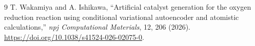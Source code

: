 \documentclass[11pt]{article}
\begin{document}
\begin{thebibliography}{9}
 T. Wakamiya and A. Ishikawa, ``Artificial catalyst generation for the oxygen reduction reaction using conditional variational autoencoder and atomistic calculations,'' \emph{npj Computational Materials}, 12, 206 (2026). \url{https://doi.org/10.1038/s41524-026-02075-0}.
\end{thebibliography}
\end{document}
